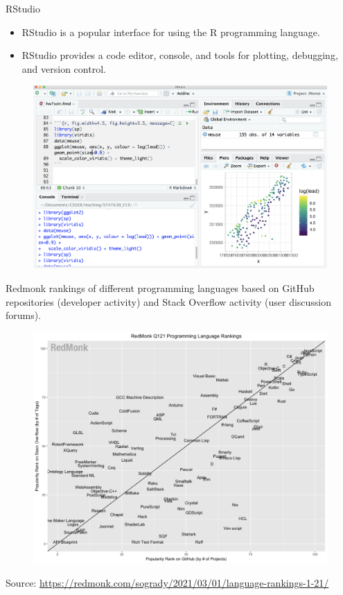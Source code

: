 \documentclass[10pt]{beamer}
\begin{document}
\begin{frame}{RStudio}
\begin{itemize}
\item RStudio is a popular interface for using the R programming language.
\vspace{5pt}
\item RStudio provides a code editor, console, and tools for plotting, debugging, and version control.
\end{itemize}
\begin{figure}
\includegraphics[scale=0.15]{figure/RStudio_screenshot.png}
\end{figure}
\end{frame}

\begin{frame}
Redmonk rankings of different programming languages based on GitHub repositories (developer activity) and Stack Overflow activity (user discussion forums).
\begin{figure}
\includegraphics[scale=0.17]{figure/redmonk2021.png}
\end{figure}
\scriptsize Source: \url{https://redmonk.com/sogrady/2021/03/01/language-rankings-1-21/}
\end{frame}
\end{document}
